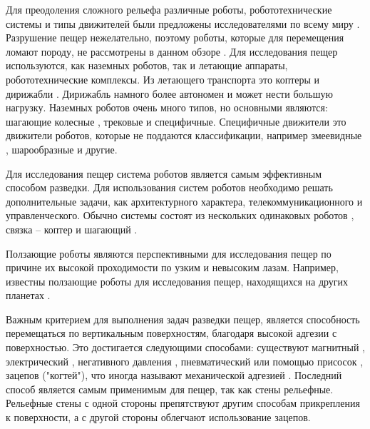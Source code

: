 Для преодоления сложного рельефа различные роботы, робототехнические системы и типы движителей были предложены исследователями по всему миру \cite{Morris2006a}. Разрушение пещер нежелательно, поэтому роботы, которые для перемещения ломают породу, не рассмотрены в данном обзоре \cite{Semini2016}. Для исследования пещер используются, как наземных роботов, так и летающие аппараты, робототехнические комплексы. Из летающего транспорта это коптеры \cite{Papachristos2019,Scaramuzza2014,zinggMAVNavigationIndoor2010} и дирижабли \cite{Huang2019}. Дирижабль намного более автономен и может нести большую нагрузку. Наземных роботов очень много типов, но основными являются: шагающие \cite{Tan2016,Lynch2019} колесные \cite{Molyneaux2016,Vaquero2018}, трековые \cite{Reddy2015} и специфичные. Специфичные движители это движители роботов, которые не поддаются классификации, например змеевидные \cite{Ye2007,Borenstein2007}, шарообразные \cite{Thangavelautham2017,Dubowsky2008,Dang2019} и другие.

Для исследования пещер система роботов является самым эффективным способом разведки. Для использования систем роботов необходимо решать дополнительные задачи, как архитектурного характера, телекоммуникационного и управленческого. Обычно системы состоят из нескольких одинаковых роботов \cite{Vaquero2018}, связка – коптер и шагающий \cite{Chen2010,Cantelli2013}.

Ползающие роботы \cite{Schmidt2013} являются перспективными для исследования пещер по причине их высокой проходимости по узким и невысоким лазам. Например, известны ползающие роботы для исследования пещер, находящихся на других планетах \cite{Parness2017}. 

Важным критерием для выполнения задач разведки пещер, является способность перемещаться по вертикальным поверхностям, благодаря высокой адгезии с поверхностью. Это достигается следующими способами: существуют магнитный \cite{Lee2012,tavakoliOmniClimberOmnidirectionalLight2012,Kotay1996,Xu2017}, электрический \cite{Li2017}, негативного давления \cite{Lee2012,tavakoliOmniClimberOmnidirectionalLight2012,Papachristos2019}, пневматический или помощью присосок \cite{Nagakubo1994,Tlale2012}, зацепов ("когтей"), что иногда называют механической адгезией \cite{Parness2017,Bretl2006,SangbaeKim2005,Sintov2011}. Последний способ является самым применимым для пещер, так как стены рельефные. Рельефные стены с одной стороны препятствуют другим способам прикрепления к поверхности, а с другой стороны облегчают использование зацепов.

